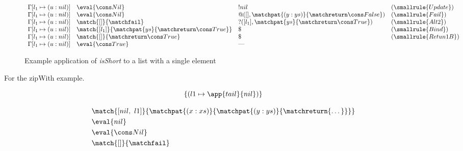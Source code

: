 \begin{figure*}
\[\begin{array}{llll}
            \Gamma[l_1\mapsto(u : nil)]             & \eval{\nil}                                                & !nil                                     & (\smallrule{Update})   \\
            \Gamma[l_1\mapsto(u : nil)]             & \eval{\nil}                                                & @([],\matchpat{(y : ys)}{\retFalse})     & (\smallrule{Fail})     \\
            \Gamma[l_1\mapsto(u : nil)]             & \match{[]}{\matchfail}                                     & ?([l_1],\matchpat{ys}{\retTrue})         & (\smallrule{Alt2})     \\
            \Gamma[l_1\mapsto(u : nil)]             & \match{[l_1]}{\matchpat{ys}{\retTrue}}                     & \$                                       & (\smallrule{Bind})     \\
            \Gamma[l_1\mapsto(u : nil)]             & \match{[]}{\retTrue}                                       & \$                                       & (\smallrule{Retun1B})  \\
            \Gamma[l_1\mapsto(u : nil)]             & \eval{\true}                                               & \text{---}                               &          \\
        \end{array}
    \]
    \caption{Example application of \textit{isShort} to a list with a single element}\label{ex:isShort}
\end{figure*}

\newcommand{\zipWithPMC}{
    \abstr{\matchalt
        {\matchpat{f}{\matchpat{(x : xs)}{\matchpat{(y : ys)}{\matchreturn{\llet{head = \app{\app{f}{x}}{y}}{\llet{tail = \app{\app{\app{zipWith}{f}}{xs}}{ys}}{(head : tail)}}}}}}}
        {\matchpat{f}{\matchpat{xs'}{\matchpat{ys'}{\matchreturn{\nil}}}}}}}
\newcommand{\tailPMC}{\abstr{\matchpat{(x : xs)}{\matchreturn{xs}}}}
\newcommand{\zipWith}{\textit{zipWith}}
\newcommand{\tail}{\textit{tail}}


For the zipWith example.

\[ \{(l1\mapsto\app{tail}{nil})\} \]

\begin{align*}
    &\match{[nil,~l1]}{\matchpat{(x : xs)}{\matchpat{(y : ys)}{\matchreturn{\dots}}}}  \\
    &\eval{nil}  \\
    &\eval{\nil}  \\
    &\match{[]}{\matchfail}  \\
\end{align*}
